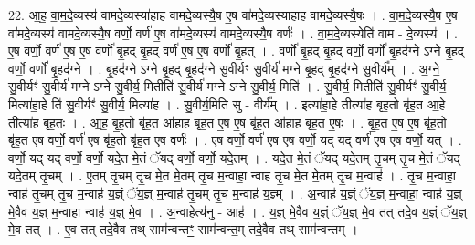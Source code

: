 \documentclass[17pt]{extarticle}
\begin{document}
22. आ॒ह॒ वा॒म॒दे॒व्यस्य॑ वामदे॒व्यस्या॑हाह वामदे॒व्यस्यै॒ष ए॒ष वा॑मदे॒व्यस्या॑हाह वामदे॒व्यस्यै॒षः । . वा॒म॒दे॒व्यस्यै॒ष ए॒ष वा॑मदे॒व्यस्य॑ वामदे॒व्यस्यै॒ष वर्णो॒ वर्ण॑ ए॒ष वा॑मदे॒व्यस्य॑ वामदे॒व्यस्यै॒ष वर्णः॑ । . वा॒म॒दे॒व्यस्येति॑ वाम - दे॒व्यस्य॑ । . ए॒ष वर्णो॒ वर्ण॑ ए॒ष ए॒ष वर्णो॑ बृ॒हद् बृ॒हद् वर्ण॑ ए॒ष ए॒ष वर्णो॑ बृ॒हत् । . वर्णो॑ बृ॒हद् बृ॒हद् वर्णो॒ वर्णो॑ बृ॒हद॑ग्ने ऽग्ने बृ॒हद् वर्णो॒ वर्णो॑ बृ॒हद॑ग्ने । . बृ॒हद॑ग्ने ऽग्ने बृ॒हद् बृ॒हद॑ग्ने सु॒वीर्यꣳ॑ सु॒वीर्य॑ मग्ने बृ॒हद् बृ॒हद॑ग्ने सु॒वीर्य᳚म् । . अ॒ग्ने॒ सु॒वीर्यꣳ॑ सु॒वीर्य॑ मग्ने ऽग्ने सु॒वीर्य॒ मितीति॑ सु॒वीर्य॑ मग्ने ऽग्ने सु॒वीर्य॒ मिति॑ । . सु॒वीर्य॒ मितीति॑ सु॒वीर्यꣳ॑ सु॒वीर्य॒ मित्या॑हा॒हे ति॑ सु॒वीर्यꣳ॑ सु॒वीर्य॒ मित्या॑ह । . सु॒वीर्य॒मिति॑ सु - वीर्य᳚म् । . इत्या॑हा॒हे तीत्या॑ह बृह॒तो बृ॑ह॒त आ॒हे तीत्या॑ह बृह॒तः । . आ॒ह॒ बृ॒ह॒तो बृ॑ह॒त आ॑हाह बृह॒त ए॒ष ए॒ष बृ॑ह॒त आ॑हाह बृह॒त ए॒षः । . बृ॒ह॒त ए॒ष ए॒ष बृ॑ह॒तो बृ॑ह॒त ए॒ष वर्णो॒ वर्ण॑ ए॒ष बृ॑ह॒तो बृ॑ह॒त ए॒ष वर्णः॑ । . ए॒ष वर्णो॒ वर्ण॑ ए॒ष ए॒ष वर्णो॒ यद् यद् वर्ण॑ ए॒ष ए॒ष वर्णो॒ यत् । . वर्णो॒ यद् यद् वर्णो॒ वर्णो॒ यदे॒त मे॒तं ॅयद् वर्णो॒ वर्णो॒ यदे॒तम् । . यदे॒त मे॒तं ॅयद् यदे॒तम् तृ॒चम् तृ॒च मे॒तं ॅयद् यदे॒तम् तृ॒चम् । . ए॒तम् तृ॒चम् तृ॒च मे॒त मे॒तम् तृ॒च म॒न्वाहा॒ न्वाह॑ तृ॒च मे॒त मे॒तम् तृ॒च म॒न्वाह॑ । . तृ॒च म॒न्वाहा॒ न्वाह॑ तृ॒चम् तृ॒च म॒न्वाह॑ य॒ज्ञ्ं ॅय॒ज्ञ् म॒न्वाह॑ तृ॒चम् तृ॒च म॒न्वाह॑ य॒ज्ञ्म् । . अ॒न्वाह॑ य॒ज्ञ्ं ॅय॒ज्ञ् म॒न्वाहा॒ न्वाह॑ य॒ज्ञ् मे॒वैव य॒ज्ञ् म॒न्वाहा॒ न्वाह॑ य॒ज्ञ् मे॒व । . अ॒न्वाहेत्य॑नु - आह॑ । . य॒ज्ञ् मे॒वैव य॒ज्ञ्ं ॅय॒ज्ञ् मे॒व तत् तदे॒व य॒ज्ञ्ं ॅय॒ज्ञ् मे॒व तत् । . ए॒व तत् तदे॒वैव तथ् साम॑न्वन्तꣳ॒॒ साम॑न्वन्त॒म् तदे॒वैव तथ् साम॑न्वन्तम् । \newline
\end{document}
